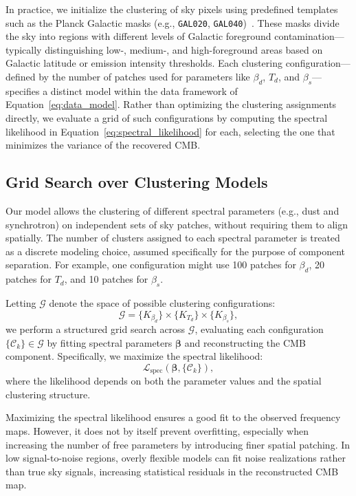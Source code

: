 \documentclass[%
 reprint,
bibnotes,
 amsmath,amssymb,
 aps,
floatfix, 
]{revtex4-2}
\begin{document}
In practice, we initialize the clustering of sky pixels using predefined templates such as the Planck Galactic masks (e.g., \texttt{GAL020}, \texttt{GAL040})~\citep{Planck2015Galactic}. These masks divide the sky into regions with different levels of Galactic foreground contamination—typically distinguishing low-, medium-, and high-foreground areas based on Galactic latitude or emission intensity thresholds.
Each clustering configuration—defined by the number of patches used for parameters like \( \beta_d \), \( T_d \), and \( \beta_s \)—specifies a distinct model within the data framework of Equation~\eqref{eq:data_model}. Rather than optimizing the clustering assignments directly, we evaluate a grid of such configurations by computing the spectral likelihood in Equation~\eqref{eq:spectral_likelihood} for each, selecting the one that minimizes the variance of the recovered CMB.

\subsection{Grid Search over Clustering Models}
\label{subsec:grid_search}

Our model allows the clustering of different spectral parameters (e.g., dust and synchrotron) on independent sets of sky patches, without requiring them to align spatially. The number of clusters assigned to each spectral parameter is treated as a discrete modeling choice, assumed specifically for the purpose of component separation. For example, one configuration might use 100 patches for \( \beta_d \), 20 patches for \( T_d \), and 10 patches for \( \beta_s \).

Letting \( \mathcal{G} \) denote the space of possible clustering configurations:
\[
\mathcal{G} = \{K_{\beta_d} \} \times \{ K_{T_d} \} \times \{ K_{\beta_s} \},
\]
we perform a structured grid search across \( \mathcal{G} \), evaluating each configuration \( \{ \mathcal{C}_k \} \in \mathcal{G} \) by fitting spectral parameters \( \boldsymbol{\beta} \) and reconstructing the CMB component. Specifically, we maximize the spectral likelihood:
\[
\mathcal{L}_{\text{spec}}(\boldsymbol{\beta}, \{ \mathcal{C}_k \}),
\]
where the likelihood depends on both the parameter values and the spatial clustering structure.

Maximizing the spectral likelihood ensures a good fit to the observed frequency maps. However, it does not by itself prevent overfitting, especially when increasing the number of free parameters by introducing finer spatial patching. In low signal-to-noise regions, overly flexible models can fit noise realizations rather than true sky signals, increasing statistical residuals in the reconstructed CMB map.
\end{document}
